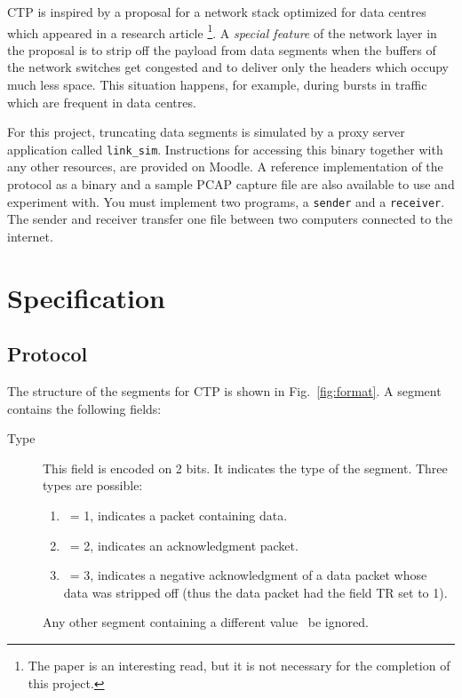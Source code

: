 \documentclass[12pt]{book}
\begin{document}
\begin{enumerate}[label=\arabic*.]
CTP is inspired by a proposal for a network stack optimized for data centres which appeared in a research article \cite{handley2017re}\footnote{The paper is an interesting read, but it is not necessary for the completion of this project.}.
A \emph{special feature} of the network layer in the proposal is to strip off the payload from data segments when the buffers of the network switches get congested and to deliver only the headers which occupy much less space. This situation happens, for example, during bursts in traffic which are frequent in data centres.

For this project, truncating data segments is simulated by a proxy server application called \verb$link_sim$. Instructions for accessing this binary together with any other resources, are provided on Moodle.
A reference implementation of the protocol as a binary and a sample PCAP capture file are also available to use and experiment with.
You must implement two programs, a \verb$sender$ and a \verb$receiver$. The sender and receiver transfer one file between two computers connected to the internet.

\section{Specification}

\subsection{Protocol}

The structure of the segments for CTP is shown in Fig.~\ref{fig:format}. A segment contains the following fields:

\begin{description}
    \item[Type] This field is encoded on 2 bits. It indicates the type of the segment. Three types are possible:
        \begin{enumerate}[label=(\alph*)]
            \item \pdata\ = 1, indicates a packet containing data.
            \item \pack\ = 2, indicates an acknowledgment packet.
            \item \pnack\ = 3, indicates a negative acknowledgment of a data packet whose data was stripped off (thus the data packet had the field TR set to 1).
        \end{enumerate}
        Any other segment containing a different value \must\ be ignored.


\end{description}
\end{enumerate}
\end{document}
